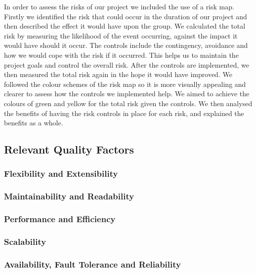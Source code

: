In order to assess the risks of our project we included the use of a risk map. Firstly we identified the risk that could occur in the duration of our project and then described the effect it would have upon the group. We calculated the total risk by measuring the likelihood of the event occurring, against the impact it would have should it occur. The controls include the contingency, avoidance and how we would cope with the risk if it occurred. This helps us to maintain the project goals and control the overall risk. After the controls are implemented, we then measured the total risk again in the hope it would have improved. We followed the colour schemes of the risk map so it is more visually appealing and clearer to assess how the controls we implemented help. We aimed to achieve the colours of green and yellow for the total risk given the controls. We then analysed the benefits of having the risk controls in place for each risk, and explained the benefits as a whole.

\subsection*{Relevant Quality Factors}

\subsubsection*{Flexibility and Extensibility} 

\subsubsection*{Maintainability and Readability} 

\subsubsection*{Performance and Efficiency} 

\subsubsection*{Scalability} 

\subsubsection*{Availability, Fault Tolerance and Reliability} 

